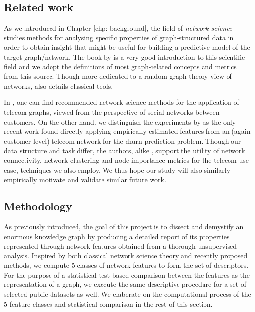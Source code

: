 \subsection{Related work}
\label{sec:related_work}

As we introduced in Chapter \ref{chp: background}, the field of \emph{network science} studies methods for analysing specific properties of graph-structured data in order to obtain insight that might be useful for building a predictive model of the target graph/network. The book by \cite{barabasi_network_2016} is a very good introduction to this scientific field and we adopt the definitions of most graph-related concepts and metrics from this source. Though more dedicated to a random graph theory view of networks, \cite{lewis_network_2011} also details classical tools.

In \cite{pinheiro_social_2011}, one can find recommended network science methods for the application of telecom graphs, viewed from the perspective of social networks between customers. On the other hand, we distinguish the experiments by \cite{kostic_social_2020} as the only recent work found directly applying empirically estimated features from an (again customer-level) telecom network for the churn prediction problem. Though our data structure and task differ, the authors, alike \cite{pinheiro_social_2011}, support the utility of network connectivity, network clustering and node importance metrics for the telecom use case, techniques we also employ. We thus hope our study will also similarly empirically motivate and validate similar future work.

\subsection{Methodology}
\label{sec:methodology_swisscom}

As previously introduced, the goal of this project is to dissect and demystify an enormous knowledge graph by producing a detailed report of its properties represented through network features obtained from a thorough unsupervised analysis. Inspired by both classical network science theory and recently proposed methods, we compute 5 classes of network features to form the set of descriptors. For the purpose of a statistical-test-based comparison between the features as the representation of a graph, we execute the same descriptive procedure for a set of selected public datasets as well. We elaborate on the computational process of the 5 feature classes and statistical comparison in the rest of this section.

